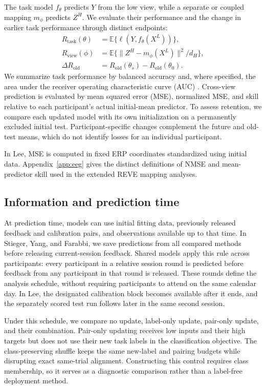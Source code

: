 \documentclass[11pt,a4paper]{article}
\newcommand{\E}{\mathbb{E}}
\begin{document}
The task model $f_\theta$ predicts $Y$ from the low view, while a separate or coupled mapping $m_\phi$ predicts $Z^H$. We evaluate their performance and the change in earlier task performance through distinct endpoints:
\begin{align}
 R_{\mathrm{task}}(\theta)&=\E\{\ell(Y,f_\theta(X^L))\},\\
 R_{\mathrm{view}}(\phi)&=\E\{\|Z^H-m_\phi(X^L)\|^2/d_H\},\\
 \Delta R_{\mathrm{old}}&=R_{\mathrm{old}}(\theta_s)-R_{\mathrm{old}}(\theta_0).
\end{align}
We summarize task performance by balanced accuracy and, where specified, the area under the receiver operating characteristic curve (AUC) \cite{delong1988}. Cross-view prediction is evaluated by mean squared error (MSE), normalized MSE, and skill relative to each participant's actual initial-mean predictor. To assess retention, we compare each updated model with its own initialization on a permanently excluded initial test. Participant-specific changes complement the future and old-test means, which do not identify losses for an individual participant.

In Lee, MSE is computed in fixed ERP coordinates standardized using initial data. Appendix~\ref{app:eeg} gives the distinct definitions of NMSE and mean-predictor skill used in the extended REVE mapping analyses.

\subsection{Information and prediction time}

At prediction time, models can use initial fitting data, previously released feedback and calibration pairs, and observations available up to that time. In Stieger, Yang, and Farabbi, we save predictions from all compared methods before releasing current-session feedback. Shared models apply this rule across participants: every participant in a relative session round is predicted before feedback from any participant in that round is released. These rounds define the analysis schedule, without requiring participants to attend on the same calendar day. In Lee, the designated calibration block becomes available after it ends, and the separately scored test run follows later in the same second session.

Under this schedule, we compare no update, label-only update, pair-only update, and their combination. Pair-only updating receives low inputs and their high targets but does not use their new task labels in the classification objective. The class-preserving shuffle keeps the same new-label and pairing budgets while disrupting exact same-trial alignment. Constructing this control requires class membership, so it serves as a diagnostic comparison rather than a label-free deployment method.
\end{document}

